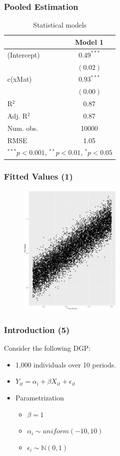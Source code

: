 \documentclass{beamer}
\newcommand{\1}{\mathbb{1}}
\newcommand{\N}{\mathbb{N}}
\begin{document}
\begin{frame}\frametitle{Pooled Estimation}
\begin{table}
\begin{center}
\begin{tabular}{l c }
\hline
 & Model 1 \\
\hline
(Intercept) & $0.49^{***}$ \\
            & $(0.02)$     \\
c(xMat)     & $0.93^{***}$ \\
            & $(0.00)$     \\
\hline
R$^2$       & 0.87         \\
Adj. R$^2$  & 0.87         \\
Num. obs.   & 10000        \\
RMSE        & 1.05         \\
\hline
\multicolumn{2}{l}{\scriptsize{$^{***}p<0.001$, $^{**}p<0.01$, $^*p<0.05$}}
\end{tabular}
\caption{Statistical models}
\label{table:coefficients}
\end{center}
\end{table}
\end{frame}

\begin{frame}\frametitle{Fitted Values (1)}
\begin{figure}
\includegraphics[width = 5cm]{plot/reg1}
\end{figure}
\end{frame}


\begin{frame}\frametitle{Introduction (5)}
Consider the following DGP:
\begin{itemize}
 \item 1,000 individuals over 10 periods. 
 \item $Y_{it} = \alpha_i + \beta X_{it} + \epsilon_{it}$
 \item Parametrization 
 \begin{itemize}
  \item $\beta = 1$
  \item $\alpha_i \sim uniform(-10,10)$
  \item $\epsilon_i \sim \N(0,1)$
 \end{itemize}
\end{itemize}
\end{frame}
\end{document}
